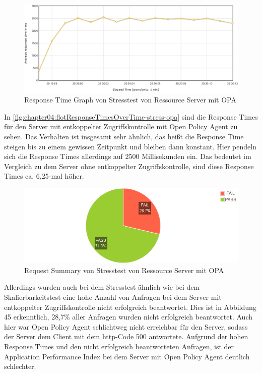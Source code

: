\begin{figure}[htbp]
  \centering
  \includegraphics[width=1.0\textwidth]{gfx/flotResponseTimesOverTime-stress-opa.png}
  \caption{Response Time Graph von Stresstest von Ressource Server mit OPA}
  \label{fig:chapter04:flotResponseTimesOverTime-stress-opa}
\end{figure}

In \autoref{fig:chapter04:flotResponseTimesOverTime-stress-opa} sind die Response Times für den Server mit entkoppelter Zugriffskontrolle mit Open Policy Agent zu sehen. Das Verhalten ist insgesamt sehr ähnlich, das heißt die Response Time steigen bis zu einem gewissen Zeitpunkt und bleiben dann konstant. Hier pendeln sich die Response Times allerdings auf 2500 Millisekunden ein. Das bedeutet im Vergleich zu dem Server ohne entkoppelter Zugriffskontrolle, sind diese Response Times ca. 6,25-mal höher. 

\begin{figure}[htbp]
  \centering
  \includegraphics[width=1.0\textwidth]{gfx/requests-summary-stress-opa.png}
  \caption{Request Summary von Stresstest von Ressource Server mit OPA}
  \label{fig:chapter04:requests-summary-stress-opa}
\end{figure}

Allerdings wurden auch bei dem Stresstest ähnlich wie bei dem Skalierbarkeitstest eine hohe Anzahl von Anfragen bei dem Server mit entkoppelter Zugriffskontrolle nicht erfolgreich beantwortet. Dies ist in Abbildung 45 erkenntlich, 28,7\% aller Anfragen wurden nicht erfolgreich beantwortet. Auch hier war Open Policy Agent schlichtweg nicht erreichbar für den Server, sodass der Server dem Client mit dem http-Code 500 antwortete.
Aufgrund der hohen Response Times und den nicht erfolgreich beantworteten Anfragen, ist der Application Performance Index bei dem Server mit Open Policy Agent deutlich schlechter. 


